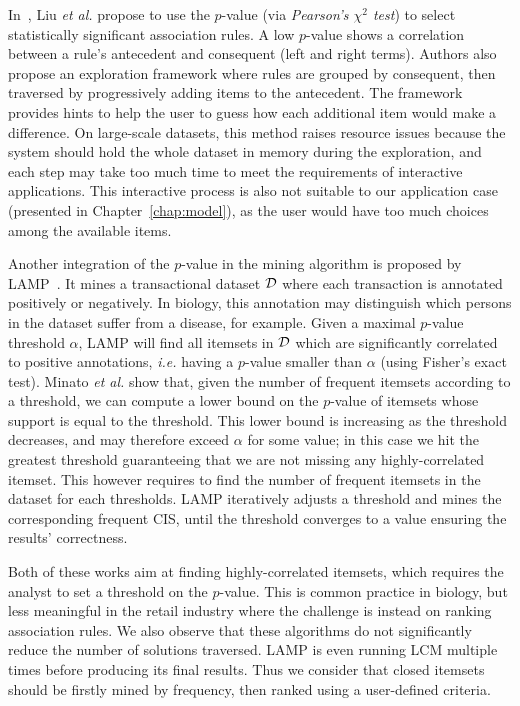 In~\cite{LiuICDE11}, Liu \textit{et al.} propose to use the $p$-value
(via {\em Pearson's $\chi^2$ test}) to select statistically significant association rules.
A low $p$-value shows a correlation between a rule's antecedent and consequent (left and right terms).
Authors also propose an exploration framework
where rules are grouped by consequent, then
traversed by progressively adding items to the antecedent.
The framework provides hints to help the user to guess how each
additional item would make a difference.
On large-scale datasets,
this method raises resource issues
because the system should hold the whole dataset in memory during the exploration,
and each step may take too much time to meet the requirements of interactive applications.
This interactive process is also not suitable to our application case (presented in Chapter~\ref{chap:model}),
as the user would have too much choices among the available items.

Another integration of the $p$-value in the mining algorithm is proposed by LAMP~\cite{MinatoKDD14}.
It mines a transactional dataset $\cal D$
where each transaction is annotated positively or negatively.
In biology, this annotation may distinguish which persons in the dataset
suffer from a disease, for example.
Given a maximal $p$-value threshold $\alpha$,
LAMP will find all itemsets in $\cal D$ which are significantly correlated to positive annotations,
{\em i.e.} having a $p$-value smaller than $\alpha$ (using Fisher's exact test).
Minato {\em et al.} show that,
given the number of frequent itemsets according to a threshold,
we can compute a lower bound on the $p$-value of itemsets whose support is equal to the threshold.
This lower bound is increasing as the threshold decreases,
and may therefore exceed $\alpha$ for some value;
in this case we hit the greatest threshold guaranteeing that we are not missing any highly-correlated itemset.
This however requires to find the number of frequent itemsets in the dataset for each thresholds.
LAMP iteratively adjusts a threshold and mines the corresponding frequent CIS,
until the threshold converges to a value ensuring the results' correctness.


Both of these works aim at finding highly-correlated itemsets,
which requires the analyst to set a threshold on the $p$-value.
This is common practice in biology,
but less meaningful in the retail industry
where the challenge is instead on ranking association rules.
We also observe that these algorithms do not significantly
reduce the number of solutions traversed.
LAMP is even running LCM multiple times before producing its final results.
Thus we consider that closed itemsets should be firstly mined by frequency,
then ranked using a user-defined criteria.








